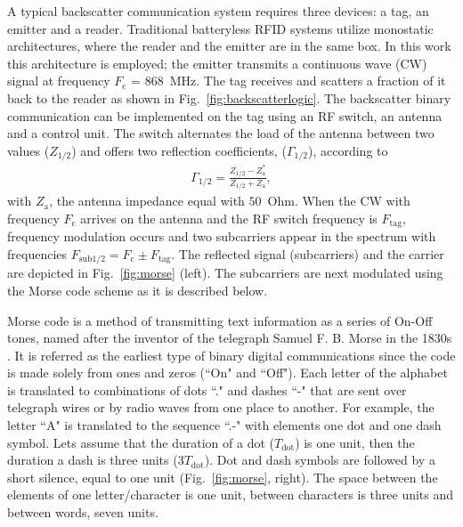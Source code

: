 \documentclass[journal]{IEEEtran}
\begin{document}
A typical  backscatter communication system requires three devices: a tag, an emitter and a reader. 
%
Traditional batteryless RFID systems utilize monostatic architectures, where the reader and the emitter are  in the same box.
%
In this work this architecture is employed; the emitter transmits a continuous wave (CW) signal at frequency $F_\text{c}$ = $868$~MHz.
%
The tag receives  and scatters a fraction of it back to the reader as shown in Fig.~\ref{fig:backscatterlogic}.
%
The backscatter binary communication can be implemented on the tag using an RF switch, an antenna and a control unit.
%
The switch  alternates the load of the antenna between two values ($Z_{1/2}$) and offers two reflection coefficients, ($\Gamma_{1/2}$), according to
%	
\begin{align}
\Gamma_\text{1/2}=\frac{Z_\text{1/2}-Z^{*}_\text{a}}{Z_\text{1/2}+Z_\text{a}},
\label{eq:gamma}
\end{align}
%
with  $Z_\text{a}$,  the antenna impedance  equal with $50$~Ohm. 
%
When the CW  with frequency $F_\text{c}$ arrives on the antenna
and the  RF switch frequency is $F_\text{tag}$, frequency modulation occurs and two subcarriers appear in the spectrum with frequencies $F_{\text{sub1/2}} = F_{\text{c}} \pm F_{\text{tag}}$.
%
The reflected signal (subcarriers) and the carrier  are depicted in Fig.~\ref{fig:morse} (left). 
%
The subcarriers are  next modulated  using the Morse code scheme as it is described below.


Morse code is a method of transmitting text information as a series of On-Off tones, named after the inventor of the telegraph Samuel F. B. Morse  in the 1830s \cite{fahie1884history}.
%
It is referred as the earliest type of binary digital communications
since the code is made solely from ones and zeros (``On" and ``Off"). 
%
%
Each letter of the alphabet is translated to combinations of dots  ``."  and dashes  ``-" that are sent over telegraph wires or by radio waves from one place to another.
%
For example, the  letter ``A" is translated to the sequence ``.-" with elements one dot and one dash symbol.
%
Lets assume that  the duration of a dot ($T_\text{dot}$) is one unit, then  the duration a dash is three units ($3T_\text{dot}$). 
%
Dot and dash symbols are followed by a short silence, equal to one unit (Fig.~\ref{fig:morse}, right). 
%
The space between the elements of one letter/character is one unit, between characters is three units and between words, seven units.
\end{document}
